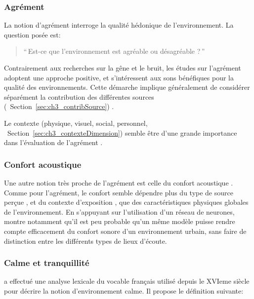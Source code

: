 

\subsubsection{Agrément}

La notion d'agrément interroge la qualité hédonique de l'environnement. La question posée est:

\begin{quote}
``\,Est-ce que l'environnement est agréable ou désagréable ?\,''
\end{quote}
 
Contrairement aux recherches sur la gêne et le bruit, les études sur l'agrément adoptent une approche positive, et s'intéressent aux sons bénéfiques pour la qualité des environnements. Cette démarche implique généralement de considérer séparément la contribution des différentes sources (\cf~Section~\ref{sec:ch3_contribSource})  \citep{lavandier2006contribution,garcia2012validation}.

Le contexte (physique, visuel, social, personnel, \cf~Section~\ref{sec:ch3_contexteDimension}) semble être d'une grande importance dans l'évaluation de l'agrément \citep{guillen2007importance}.


\subsubsection{Confort acoustique}
\label{sec:ch3_confort}

Une autre notion très proche de l'agrément est celle du confort acoustique \citep{jeon2011non,tse2012perception,jeon2013soundwalk}. Comme pour l'agrément, le confort semble dépendre plus du type de source perçue \citep{yang2005acoustic}, et du contexte d'exposition \citep{meng2013field}, que des caractéristiques physiques globales de l'environnement. En s'appuyant sur l'utilisation d'un réseau de neurones, \citep{yu2009modeling} montre notamment qu'il est peu probable qu'un même modèle puisse rendre compte efficacement du confort sonore d'un environnement urbain, sans faire de distinction entre les différents types de lieux d'écoute.

\subsubsection{Calme et tranquillité}

\citep{delaitre2012definition} a effectué une analyse lexicale du vocable français utilisé depuis le XVIeme siècle pour décrire la notion d'environnement calme. Il propose le définition suivante:

